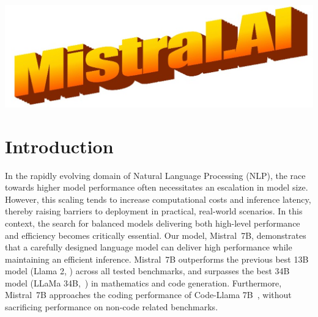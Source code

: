 \documentclass{article}
\title{\mistral}
\author{%
Albert Q. Jiang, Alexandre Sablayrolles, Arthur Mensch, Chris Bamford, \\
\textbf{Devendra Singh Chaplot, Diego de las Casas, Florian Bressand, Gianna Lengyel,}\\
\textbf{Guillaume Lample, Lucile Saulnier, Lélio Renard Lavaud, Marie-Anne Lachaux,} \\
\textbf{Pierre Stock, Teven Le Scao, Thibaut Lavril, Thomas Wang, Timothée Lacroix,}\\
\textbf{William El Sayed}\\
}
\def\llama{Llama\xspace}
\def\mistral{Mistral~7B\xspace}
\def\mistralchat{Mistral~7B~--~Instruct\xspace}
\begin{document}
\maketitle


\begin{center}
\vspace{-30pt}
\centering
\includegraphics[width=0.8\linewidth,keepaspectratio]{images/header.jpeg}
\end{center}


\begin{abstract}
We introduce \mistral, a 7--billion-parameter language model engineered for superior performance and efficiency.
\mistral outperforms the best open 13B model (Llama 2) across all evaluated benchmarks, and the best released 34B model (Llama 1) in reasoning, mathematics, and code generation.
Our model leverages grouped-query attention (GQA) for faster inference, coupled with sliding window attention (SWA) to effectively handle sequences of arbitrary length with a reduced inference cost.
We also provide a model fine-tuned to follow instructions, \mistralchat, that surpasses \llama~2~13B~--~chat model both on human and automated benchmarks.
Our models are released under the Apache 2.0 license.\\
\textbf{Code:} \url{https://github.com/mistralai/mistral-src} \\
\textbf{Webpage:} \url{https://mistral.ai/news/announcing-mistral-7b/}
\end{abstract}


\section{Introduction}

 In the rapidly evolving domain of Natural Language Processing (NLP), the race towards higher model performance often necessitates an escalation in model size.
However, this scaling tends to increase computational costs and inference latency, thereby raising barriers to deployment in practical, real-world scenarios.
In this context, the search for balanced models delivering both high-level performance and efficiency becomes critically essential.
Our model, \mistral, demonstrates that a carefully designed language model can deliver high performance while maintaining an efficient inference.
\mistral outperforms the previous best 13B model (Llama 2, \cite{touvron2023llama2}) across all tested benchmarks, and surpasses the best 34B model (LLaMa 34B,~\cite{touvron2023llama}) in mathematics and code generation.
Furthermore, \mistral approaches the coding performance of Code-\llama 7B~\cite{roziere2023code}, without sacrificing performance on non-code related benchmarks.
\end{document}
